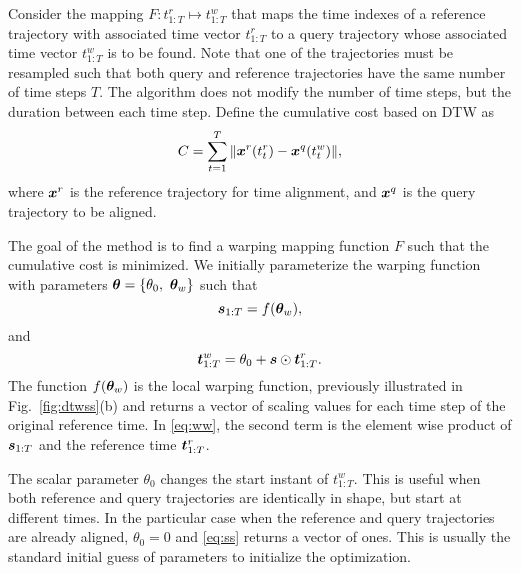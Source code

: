 
Consider the mapping $F: t^{r}_{1:T} \mapsto t^{w}_{1:T}$ that maps the time indexes of a reference 
trajectory with associated time vector $t^{r}_{1:T}$ to a query trajectory whose associated time vector $t^{w}_{1:T}$ is to be found.
Note that one of the trajectories must be resampled such that both query and reference trajectories have the same number of time steps $T$.
The algorithm does not modify the number of time steps, but the duration between each time step.
Define the cumulative cost based on DTW as 
\begin{equation}
	C = \sum_{t=1}^T \| \boldsymbol{x}^r( t^{r}_t) - \boldsymbol{x}^q( t^w_t )    \|,
	\label{eq:dtwcost}
\end{equation}
where $\boldsymbol{x}^r$ is the reference trajectory for time alignment, and $\boldsymbol{x}^q$ is the query trajectory to be aligned.

The goal of the method is to find a warping mapping function $F$ such that the cumulative cost is minimized.
We initially parameterize the warping function with parameters $\boldsymbol{\theta} = \{\theta_0, \ \boldsymbol{\theta}_w\}$ such that
\begin{equation}
	\boldsymbol{s}_{1:T}  = f(\boldsymbol{\theta}_w),
	\label{eq:ss}
\end{equation}
and 
\begin{equation}
	\boldsymbol{t}^w_{1:T}  = \theta_0 + \boldsymbol{s} \odot \boldsymbol{t}^{r}_{1:T}.
	\label{eq:ww}
\end{equation}
The function $f(\boldsymbol{\theta}_w)$ is the local warping function, previously illustrated in Fig.~\ref{fig:dtwss}(b) and returns a vector of scaling values for each time step of the original reference time.
In \eqref{eq:ww}, the  second term is the element wise product of $\boldsymbol{s}_{1:T}$ and the reference time  $\boldsymbol{t}^r_{1:T}$.

The scalar parameter $\theta_0$ changes the start instant of $t^w_{1:T}$.
This is useful when both reference and query trajectories are identically in shape, but start at different times.
%
%
In the particular case when the reference and query trajectories are already aligned, $\theta_0=0$ and \eqref{eq:ss} returns a vector of ones.
This is usually the standard initial guess of parameters to initialize the optimization.

